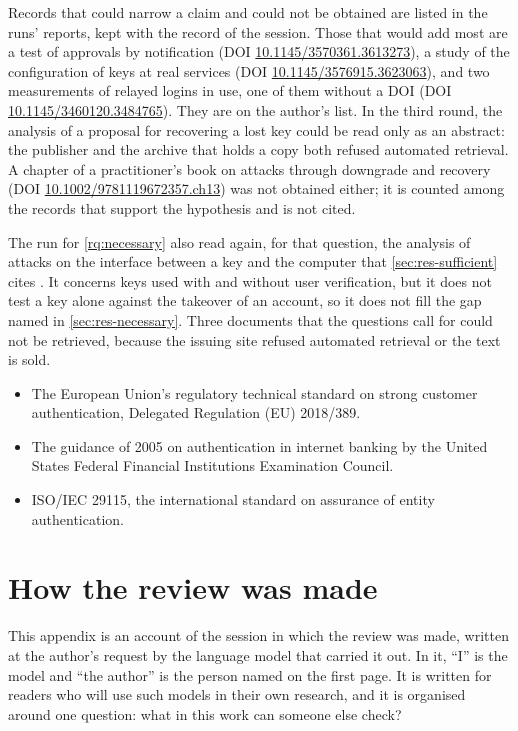 Records that could narrow a claim and could not be obtained are listed
in the runs' reports, kept with the record of the session.
Those that would add most are a test of approvals by notification
(DOI \url{10.1145/3570361.3613273}), a study of the configuration of
keys at real services (DOI \url{10.1145/3576915.3623063}), and two
measurements of relayed logins in use, one of them without a DOI
(DOI \url{10.1145/3460120.3484765}).
They are on the author's list.
In the third round, the analysis of a proposal for recovering a lost
key \autocite{Frymann2020ARKG} could be read only as an abstract: the
publisher and the archive that holds a copy both refused automated
retrieval.
A chapter of a practitioner's book on attacks through downgrade and
recovery (DOI \url{10.1002/9781119672357.ch13}) was not obtained
either; it is counted among the records that support the hypothesis and
is not cited.

The run for \cref{rq:necessary} also read again, for that question, the
analysis of attacks on the interface between a key and the computer
that \cref{sec:res-sufficient} cites \autocite{Casagrande2025CTRAPS}.
It concerns keys used with and without user verification, but it does
not test a key alone against the takeover of an account, so it does not
fill the gap named in \cref{sec:res-necessary}.
Three documents that the questions call for could not be retrieved,
because the issuing site refused automated retrieval or the text is
sold.
\begin{itemize}
  \item The European Union's regulatory technical standard on strong
    customer authentication, Delegated Regulation (EU) 2018/389.
  \item The guidance of 2005 on authentication in internet banking by
    the United States Federal Financial Institutions Examination
    Council.
  \item ISO/IEC 29115, the international standard on assurance of
    entity authentication.
\end{itemize}


\section{How the review was made}\label{sec:session}

This appendix is an account of the session in which the review was made,
written at the author's request by the language model that carried it
out.
In it, \enquote{I} is the model and \enquote{the author} is the person
named on the first page.
It is written for readers who will use such models in their own
research, and it is organised around one question: what in this work can
someone else check?

